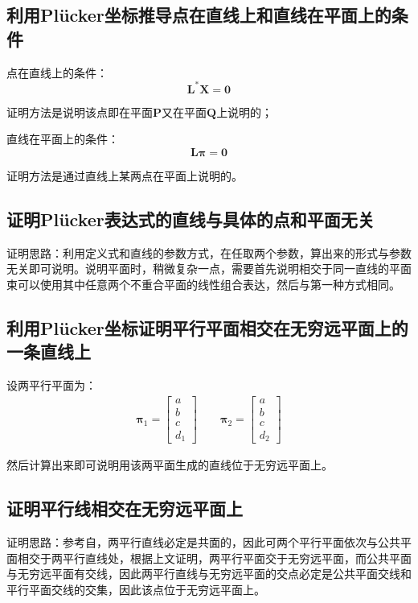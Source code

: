 \documentclass[11pt]{article}
\begin{document}
\subsection{利用Plücker坐标推导点在直线上和直线在平面上的条件}
点在直线上的条件：
\begin{equation*}
  \mathbf{L^*X}=\mathbf{0}
\end{equation*}\par
证明方法是说明该点即在平面$\mathbf{P}$又在平面$\mathbf{Q}$上说明的；\par
直线在平面上的条件：
\begin{equation*}
  \mathbold{L\pi}=\mathbf{0}
\end{equation*}\par
证明方法是通过直线上某两点在平面上说明的。
\subsection{证明Plücker表达式的直线与具体的点和平面无关}
证明思路：利用定义式和直线的参数方式，在任取两个参数，算出来的形式与参数无关即可说明。说明平面时，稍微复杂一点，需要首先说明相交于同一直线的平面束可以使用其中任意两个不重合平面的线性组合表达，然后与第一种方式相同。
\subsection{利用Plücker坐标证明平行平面相交在无穷远平面上的一条直线上}
设两平行平面为：
\begin{align*}
  \mathbold{\pi}_1=\begin{bmatrix}
                     a \\b\\c\\d_1
                   \end{bmatrix}\qquad\mathbold{\pi}_2=\begin{bmatrix}
                                                         a \\b\\c\\d_2
                                                       \end{bmatrix}
\end{align*}\par
然后计算出来即可说明用该两平面生成的直线位于无穷远平面上。
\subsection{证明平行线相交在无穷远平面上}
证明思路：参考自\cite{MultipleViewGeometrya}，两平行直线必定是共面的，因此可两个平行平面依次与公共平面相交于两平行直线处，根据上文证明，两平行平面交于无穷远平面，而公共平面与无穷远平面有交线，因此两平行直线与无穷远平面的交点必定是公共平面交线和平行平面交线的交集，因此该点位于无穷远平面上。
\end{document}
